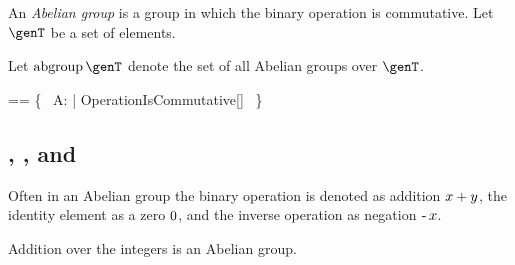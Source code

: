 \documentclass{amsart}
\begin{document}
An {\em Abelian group} is a group in which the binary operation is commutative.
Let $\genT$ be a set of elements.

Let $\abgroup \genT$ denote the set of all Abelian groups over $\genT$.

\begin{zed}
\abgroup \genT == \{~ A: \group \genT | OperationIsCommutative[\genT] ~\}
\end{zed}

\subsection{, , and }

Often in an Abelian group the binary operation is denoted as addition $x \mathbin{+} y$,
the identity element as a zero $0$, and the inverse operation as negation $\operatorname{-} x$.

\begin{example}
Addition over the integers is an Abelian group.

\begin{zed}
	(\_ + \_) \in \abgroup \num
\end{zed}

\end{example}

\printbibliography
\end{document}

